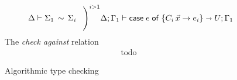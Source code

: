 \begin{figure}[h!]
\begin{gather*}
{\begin{array}{c}
                \ctxequiv{\Sigma_1}{\Sigma_i} 
              \end{array}
              \;\Bigg)^{i>1}
            }{
              \algtypeout[\kindEnv;\varEnv_1]{\casee{e}{\{C_i\,\vec x\rightarrow e_i\}}}{U}{\varEnv_1}
            }
\end{gather*}
% 
% 
The \emph{check against} relation\hfill{}
\begin{gather*}
  \text{todo}
\end{gather*}
\caption{Algorithmic type checking}
\label{fig:alg-typing}
\end{figure}

